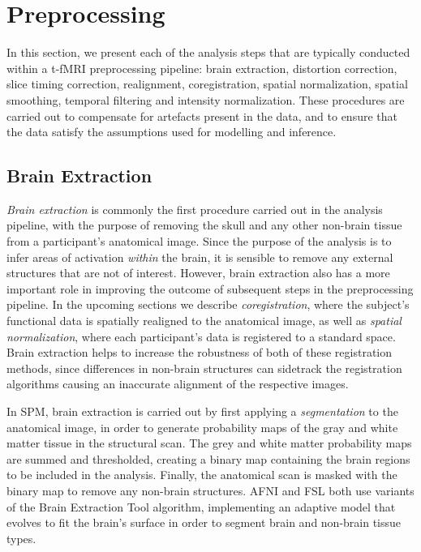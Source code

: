\section{Preprocessing}

In this section, we present each of the analysis steps that are typically conducted within a t-fMRI preprocessing pipeline: brain extraction, distortion correction, slice timing correction, realignment, coregistration, spatial normalization, spatial smoothing, temporal filtering and intensity normalization. These procedures are carried out to compensate for artefacts present in the data, and to ensure that the data satisfy the assumptions used for modelling and inference. 

\subsection{Brain Extraction}

\textit{Brain extraction} is commonly the first procedure carried out in the analysis pipeline, with the purpose of removing the skull and any other non-brain tissue from a participant's anatomical image. Since the purpose of the analysis is to infer areas of activation \textit{within} the brain, it is sensible to remove any external structures that are not of interest. However, brain extraction also has a more important role in improving the outcome of subsequent steps in the preprocessing pipeline. In the upcoming sections we describe \textit{coregistration}, where the subject's functional data is spatially realigned to the anatomical image, as well as \textit{spatial normalization}, where each participant's data is registered to a standard space. Brain extraction helps to increase the robustness of both of these registration methods, since differences in non-brain structures can sidetrack the registration algorithms causing an inaccurate alignment of the respective images. 

In SPM, brain extraction is carried out by first applying a \textit{segmentation} to the anatomical image, in order to generate probability maps of the gray and white matter tissue in the structural scan. The grey and white matter probability maps are summed and thresholded, creating a binary map containing the brain regions to be included in the analysis. Finally, the anatomical scan is masked with the binary map to remove any non-brain structures. AFNI and FSL both use variants of the Brain Extraction Tool \citep{Smith2002-vw} algorithm, implementing an adaptive model that evolves to fit the brain's surface in order to segment brain and non-brain tissue types. 

